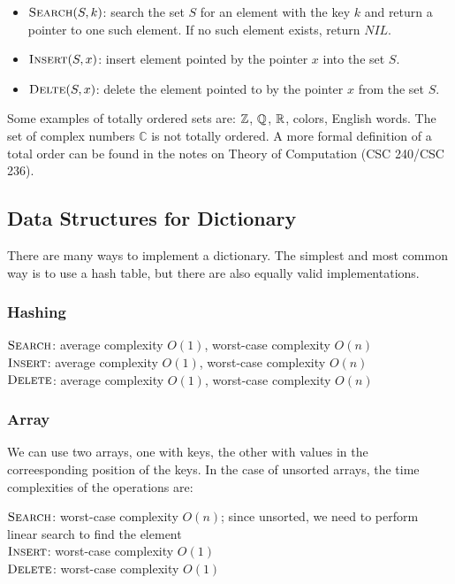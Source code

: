 \begin{itemize}
    \item $\textsc{Search}(S,k)$: search the set $S$ for an element with the key $k$ and return a pointer to one such element. If no such element exists, return $NIL$.
    \item $\textsc{Insert}(S,x)$: insert element pointed by the pointer $x$ into the set $S$.
    \item $\textsc{Delte}(S,x)$: delete the element pointed to by the pointer $x$ from the set $S$.
\end{itemize}

\begin{remark}
    Some examples of totally ordered sets are: $\mathbb{Z}$, $\mathbb{Q}$, $\mathbb{R}$, colors, English words. The set of complex numbers $\mathbb{C}$ is not totally ordered. A more formal definition of a total order can be found in the notes on Theory of Computation (CSC 240/CSC 236).
\end{remark}

\subsection{Data Structures for Dictionary}

There are many ways to implement a dictionary. The simplest and most common way is to use a hash table, but there are also equally valid implementations.

\subsubsection{Hashing}

$\textsc{Search}$: average complexity $O(1)$, worst-case complexity $O(n)$ \\
$\textsc{Insert}$: average complexity $O(1)$, worst-case complexity $O(n)$ \\
$\textsc{Delete}$: average complexity $O(1)$, worst-case complexity $O(n)$

\subsubsection{Array}

We can use two arrays, one with keys, the other with values in the correesponding position of the keys. In the case of unsorted arrays, the time complexities of the operations are:

$\textsc{Search}$: worst-case complexity $O(n)$; since unsorted, we need to perform linear search to find the element \\
$\textsc{Insert}$: worst-case complexity $O(1)$ \\
$\textsc{Delete}$: worst-case complexity $O(1)$


